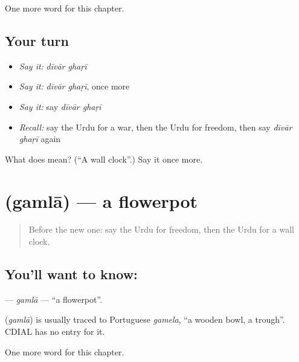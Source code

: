 \begin{grammarlens}[title={What you've built}]
One more word for this chapter.
\end{grammarlens}

\subsection*{Your turn}
\begin{itemize}
\raggedright
  \item \emph{Say it:} \emph{dīvār ghaṛī}
  \item \emph{Say it:} \emph{dīvār ghaṛī}, once more
  \item \emph{Say it:} say \emph{dīvār ghaṛī}
  \item \emph{Recall:} say the Urdu for a war, then the Urdu for freedom, then say \emph{dīvār ghaṛī} again
\end{itemize}

\begin{tcolorbox}[breakable,colback=teal!4,colframe=teal!35!black,title={Before you move on}]
What does   mean? (\textquotedblleft{}A wall clock\textquotedblright{}.) Say it once more.
\end{tcolorbox}
\section[\texorpdfstring{\ur{گملا} (gamlā)}{گملا (gamlā)}]{ (gamlā) — a flowerpot}

\label{lesson:UR-C173-gamla}



\begin{quote}
Before the new one: say the Urdu for freedom, then the Urdu for a wall clock.
\end{quote}

\subsection*{You'll want to know: }
\textbf{} — \emph{gamlā} — \textquotedblleft{}a flowerpot\textquotedblright{}.

\begin{cousinweb}
\textbf{} (\emph{gamlā}) is usually traced to Portuguese \emph{gamela}, \textquotedblleft{}a wooden bowl, a trough\textquotedblright{}. CDIAL has no entry for it.
\end{cousinweb}

\begin{grammarlens}[title={What you've built}]
One more word for this chapter.
\end{grammarlens}


